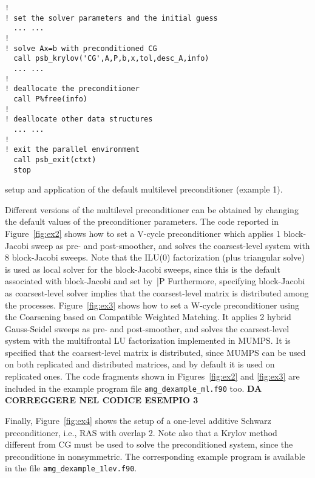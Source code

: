 \begin{listing}[tbp]
\begin{center}
\begin{minipage}{.90\textwidth}
{\begin{verbatim}
!
! set the solver parameters and the initial guess
  ... ...
!
! solve Ax=b with preconditioned CG
  call psb_krylov('CG',A,P,b,x,tol,desc_A,info)
  ... ...
!
! deallocate the preconditioner
  call P%free(info)
!
! deallocate other data structures
  ... ...
!
! exit the parallel environment
  call psb_exit(ctxt)
  stop
\end{verbatim}
}
\fi
\end{minipage}
\caption{setup and application of the default multilevel preconditioner (example 1).
\label{fig:ex1}}
\end{center}
\end{listing}

Different versions of the multilevel preconditioner can be obtained by changing
the default values of the preconditioner parameters. The code reported in
Figure~\ref{fig:ex2} shows how to set a V-cycle preconditioner
which applies 1 block-Jacobi sweep as pre- and post-smoother,
and solves the coarsest-level system with 8 block-Jacobi sweeps.
Note that the ILU(0) factorization (plus triangular solve) is used as
local solver for the block-Jacobi sweeps, since this is the default associated
with block-Jacobi and set by~\fortinline|P%
Furthermore, specifying block-Jacobi as coarsest-level
solver implies that the coarsest-level matrix is distributed
among the processes.
Figure~\ref{fig:ex3} shows how to set a W-cycle preconditioner using the Coarsening based on Compatible Weighted Matching. It applies
2 hybrid Gauss-Seidel sweeps as pre- and post-smoother,
and solves the coarsest-level system with the multifrontal LU factorization
implemented in MUMPS. It is specified that the coarsest-level
matrix is distributed, since MUMPS can be used on both
replicated and distributed matrices, and by default
it is used on replicated ones.
The code fragments shown in Figures~\ref{fig:ex2} and \ref{fig:ex3} are
included in the example program file \verb|amg_dexample_ml.f90| too. \textbf{DA CORREGGERE NEL CODICE ESEMPIO 3}

Finally, Figure~\ref{fig:ex4} shows the setup of a one-level
additive Schwarz preconditioner, i.e., RAS with overlap 2.
Note also that a Krylov method different from CG must be used to solve
the preconditioned system, since the preconditione in nonsymmetric.
The corresponding example program is available in the file
\verb|amg_dexample_1lev.f90|.

